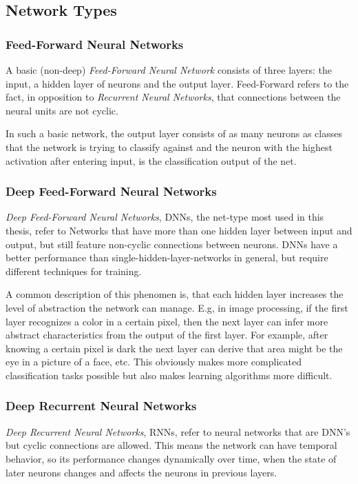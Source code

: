 \subsection{Network Types}
\label{sec:fund:types}

\subsubsection{Feed-Forward Neural Networks}
A basic (non-deep) \textit{Feed-Forward Neural Network} consists of three layers: the input, a hidden layer of neurons and the output layer. Feed-Forward refers to the fact, in opposition to \textit{Recurrent Neural Networks}, that connections between the neural units are not cyclic. 

In such a basic network, the output layer consists of as many neurons as classes that the network is trying to classify against and the neuron with the highest activation after entering input, is the classification output of the net.

\subsubsection{Deep Feed-Forward Neural Networks}
\textit{Deep Feed-Forward Neural Networks}, DNNs, the net-type most used in this thesis, refer to Networks that have more than one hidden layer between input and output, but still feature non-cyclic connections between neurons. DNNs have a better performance than single-hidden-layer-networks in general, but require different techniques for training. 

A common description of this phenomen is, that each hidden layer increases the level of abstraction the network can manage. E.g, in image processing, if the first layer recognizes a color in a certain pixel, then the next layer can infer more abstract characteristics from the output of the first layer. For example, after knowing a certain pixel is dark the next layer can derive that area might be the eye in a picture of a face, etc. This obviously makes more complicated classification tasks possible but also makes learning algorithms more difficult.

\subsubsection{Deep Recurrent Neural Networks}
\textit{Deep Recurrent Neural Networks}, RNNs, refer to neural networks that are DNN's but cyclic connections are allowed. This means the network can have temporal behavior, so its performance changes dynamically over time, when the state of later neurons changes and affects the neurons in previous layers.


